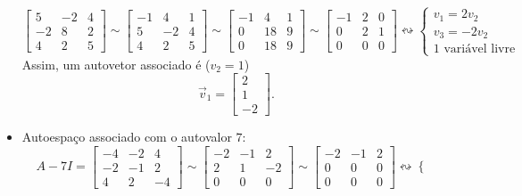 \begin{ex}
\begin{itemize}
\begin{equation}
\begin{bmatrix}
		5 & -2 & 4 \\
		-2 & 8 & 2 \\
		4 & 2 & 5
		\end{bmatrix} \sim
		\begin{bmatrix}
		-1 & 4 & 1 \\
		5 & -2 & 4 \\
		4 & 2 & 5
		\end{bmatrix} \sim
		\begin{bmatrix}
		-1 & 4 & 1 \\
		0 & 18 & 9 \\
		0 & 18 & 9
		\end{bmatrix} \sim
		\begin{bmatrix}
		-1 & 2 & 0 \\
		0 &  2 & 1 \\
		0 &  0 & 0
		\end{bmatrix} \leftrightsquigarrow
		\left\lbrace
		\begin{array}{l}
		v_1 = 2 v_2 \\
		v_3 = - 2 v_2 \\
		\text{1 variável livre}
		\end{array}
		\right.
		\end{equation} Assim, um autovetor associado é ($v_2 = 1$)
		\begin{equation}
		\vec{v}_1 =
		\begin{bmatrix}
		2 \\ 1 \\ -2
		\end{bmatrix}.
		\end{equation}
		\item Autoespaço associado com o autovalor $7$:
		\begin{equation}
		A - 7 I =
		\begin{bmatrix}
		-4 & -2 & 4 \\
		-2 & -1 & 2 \\
		4 & 2 & -4
		\end{bmatrix} \sim
		\begin{bmatrix}
		-2 & -1 & 2 \\
		2 & 1 & -2 \\
		0 & 0 & 0
		\end{bmatrix} \sim
		\begin{bmatrix}
		-2 & -1 & 2 \\
		0 & 0 & 0 \\
		0 & 0 & 0
		\end{bmatrix} \leftrightsquigarrow
		\left\lbrace
		\begin{array}{l}

\end{array}
\end{equation}
\end{itemize}
\end{ex}
